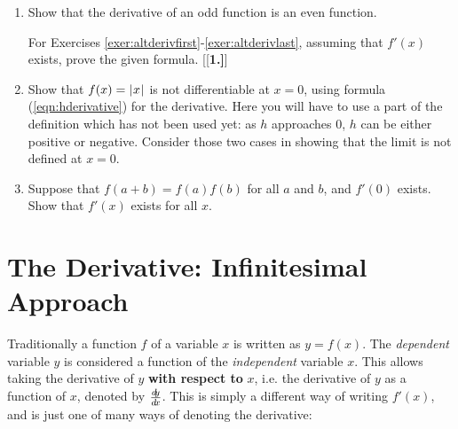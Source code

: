 {\begin{enumerate}[\bfseries 1.]
 interval $(a,b)$ and $f(x) < g(x)$ for all $x$ in $(a,b)$, then $f'(x) < g'(x)$
 for all $x$ in $(a,b)$. If true, prove it; if false, give a counterexample.
 Would your answer change if the restriction of $x$ to $(a,b)$ were removed and
 all real $x$ were used instead?
 \item Show that the derivative of an odd function is an even function.
\par\noindent For Exercises \ref{exer:altderivfirst}-\ref{exer:altderivlast},
assuming that $f'(x)$ exists, prove the given formula.
[{[\bfseries 1.]}]
 \vspace{2mm}
 \vspace{2mm}
 \item Show that $f(x) = \lvert\mspace{1mu}x\mspace{1mu}\rvert$ is not differentiable at $x=0$, using formula
 (\ref{eqn:hderivative}) for the derivative. Here you will have to use a part of
 the definition which has not been used yet: as $h$ approaches 0, $h$
 can be either positive or negative. Consider those two cases in showing that
 the limit is not defined at $x=0$.
 \item Suppose that $f(a+b) = f(a)f(b)$ for all $a$ and $b$, and
 $f'(0)$ exists. Show that $f'(x)$ exists for all $x$.
\end{enumerate}}
\newpage
\section{The Derivative: Infinitesimal Approach}
Traditionally a function $f$ of a variable $x$ is written as $y=f(x)$. The
\emph{dependent} variable $y$ is considered a function of the \emph{independent}
variable $x$. This allows taking the derivative of $y$ \textbf{with respect to}
$x$, i.e. the derivative of $y$ as a function of $x$, denoted by
$\frac{d\negmedspace y}{d\!x}$. This is simply a different way of writing $f'(x)$, and is just one of
many ways of denoting the derivative:\index{$\dx$}

